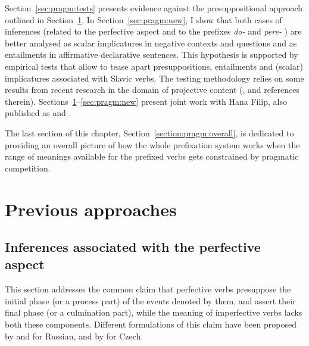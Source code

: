 Section~\ref{sec:pragm:tests} presents evidence against the presuppositional approach outlined in Section~\ref{sec:pragm:old}. In Section~\ref{sec:pragm:new}, I show that both cases of inferences (related to the perfective aspect and to the prefixes \textit{do-}   and \textit{pere-}  ) are better analysed as scalar implicatures in negative contexts   and questions and as entailments in affirmative declarative sentences. This hypothesis is supported by empirical tests that allow to tease apart presuppositions, entailments and (scalar) implicatures associated with Slavic verbs. The testing methodology relies on some results from recent research in the domain of projective content (\citealp{Schlenker:08, Chemla:09, Romoli:11}, and references therein). Sections~\ref{sec:pragm:old}--\ref{sec:pragm:new} present joint work with Hana Filip, also published as \citealt{ZinovaFilip:SALT} and \citealt{ZinovaFilip:14}. %

The last section of this chapter, Section~\ref{section:pragm:overall}, is dedicated to providing an overall picture of how the whole prefixation  system works when the range of meanings available for the prefixed verbs gets constrained by pragmatic competition. 

\section{Previous approaches}\label{sec:pragm:old}
\subsection{Inferences associated with the perfective aspect}\label{sec:pragm:old:perf}
This section addresses the common claim that perfective verbs  presuppose the initial phase (or a process part) of the events denoted by them, and assert their final phase (or a culmination part), while the meaning of imperfective verbs  lacks both these components. Different formulations of this claim have been proposed by \citet{Paducheva:96, Paducheva:11} and \citet{Romanova:06} for Russian, and by \citet{Docekal:09} for Czech.


